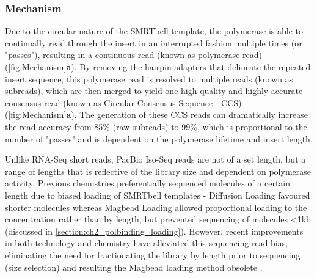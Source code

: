 \vspace{1cm}
\subsubsection{Mechanism}
Due to the circular nature of the SMRTbell template, the polymerase is able to continually read through the insert in an interrupted fashion multiple times (or "passes"), resulting in a continuous read (known as polymerase read) (\cref{fig:Mechanism}\textbf{a}). By removing the hairpin-adapters that delineate the repeated insert sequence, this polymerase read is resolved to multiple reads (known as subreads), which are then merged to yield one high-quality and highly-accurate consensus read (known as Circular Consensus Sequence - CCS) (\cref{fig:Mechanism}\textbf{a}). The generation of these CCS reads can dramatically increase the read accuracy from 85\% (raw subreads) to 99\%, which is proportional to the number of "passes" and is dependent on the polymerase lifetime and insert length\cite{Travers2010}. 

Unlike RNA-Seq short reads, PacBio Iso-Seq reads are not of a set length, but a range of lengths that is reflective of the library size and dependent on polymerase activity\cite{Ardui2018,Rhoads2015}. Previous chemistries preferentially sequenced molecules of a certain length due to biased loading of SMRTbell templates - Diffusion Loading favoured shorter molecules\cite{Loomis2013} whereas Magbead Loading allowed proportional loading to the concentration rather than by length, but prevented sequencing of molecules <1kb (discussed in \cref{section:ch2_polbinding_loading}). However, recent improvements in both technology and chemistry have alleviated this sequencing read bias, eliminating the need for fractionating the library by length prior to sequencing (size selection) and resulting the Magbead loading method obsolete \cite{Oikonomopoulos2020}.

